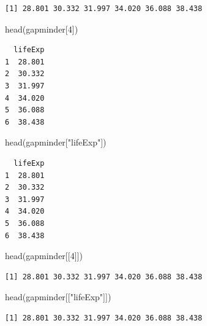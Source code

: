 \documentclass[
  letterpaper,
  DIV=11,
  numbers=noendperiod]{scrreprt}
\newenvironment{Shaded}{\begin{snugshade}}{\end{snugshade}}
\newcommand{\DecValTok}[1]{\textcolor[rgb]{0.68,0.00,0.00}{#1}}
\newcommand{\FunctionTok}[1]{\textcolor[rgb]{0.28,0.35,0.67}{#1}}
\newcommand{\NormalTok}[1]{\textcolor[rgb]{0.00,0.23,0.31}{#1}}
\newcommand{\SpecialCharTok}[1]{\textcolor[rgb]{0.37,0.37,0.37}{#1}}
\newcommand{\StringTok}[1]{\textcolor[rgb]{0.13,0.47,0.30}{#1}}
\begin{document}
\begin{Shaded}
\end{Shaded}

\begin{verbatim}
[1] 28.801 30.332 31.997 34.020 36.088 38.438
\end{verbatim}

\begin{Shaded}
\begin{Highlighting}[]
\FunctionTok{head}\NormalTok{(gapminder[}\DecValTok{4}\NormalTok{])}
\end{Highlighting}
\end{Shaded}

\begin{verbatim}
  lifeExp
1  28.801
2  30.332
3  31.997
4  34.020
5  36.088
6  38.438
\end{verbatim}

\begin{Shaded}
\begin{Highlighting}[]
\FunctionTok{head}\NormalTok{(gapminder[}\StringTok{"lifeExp"}\NormalTok{])}
\end{Highlighting}
\end{Shaded}

\begin{verbatim}
  lifeExp
1  28.801
2  30.332
3  31.997
4  34.020
5  36.088
6  38.438
\end{verbatim}

\begin{Shaded}
\begin{Highlighting}[]
\FunctionTok{head}\NormalTok{(gapminder[[}\DecValTok{4}\NormalTok{]])}
\end{Highlighting}
\end{Shaded}

\begin{verbatim}
[1] 28.801 30.332 31.997 34.020 36.088 38.438
\end{verbatim}

\begin{Shaded}
\begin{Highlighting}[]
\FunctionTok{head}\NormalTok{(gapminder[[}\StringTok{"lifeExp"}\NormalTok{]])}
\end{Highlighting}
\end{Shaded}

\begin{verbatim}
[1] 28.801 30.332 31.997 34.020 36.088 38.438
\end{verbatim}
\end{document}
